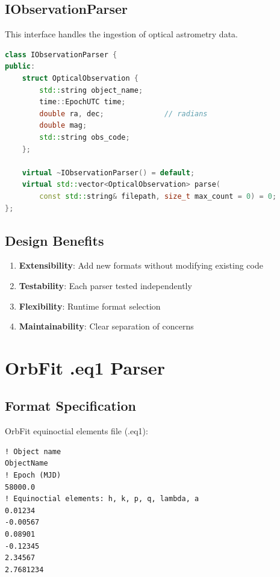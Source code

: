 \subsection{IObservationParser}

This interface handles the ingestion of optical astrometry data.

\begin{lstlisting}[language=C++,caption={IObservationParser interface}]
class IObservationParser {
public:
    struct OpticalObservation {
        std::string object_name;
        time::EpochUTC time;
        double ra, dec;              // radians
        double mag;
        std::string obs_code;
    };

    virtual ~IObservationParser() = default;
    virtual std::vector<OpticalObservation> parse(
        const std::string& filepath, size_t max_count = 0) = 0;
};
\end{lstlisting}

\subsection{Design Benefits}

\begin{enumerate}
    \item \textbf{Extensibility}: Add new formats without modifying existing code
    \item \textbf{Testability}: Each parser tested independently
    \item \textbf{Flexibility}: Runtime format selection
    \item \textbf{Maintainability}: Clear separation of concerns
\end{enumerate}

\section{OrbFit .eq1 Parser}

\subsection{Format Specification}

OrbFit equinoctial elements file (.eq1):

\begin{verbatim}
! Object name
ObjectName
! Epoch (MJD)
58000.0
! Equinoctial elements: h, k, p, q, lambda, a
0.01234
-0.00567
0.08901
-0.12345
2.34567
2.7681234
\end{verbatim}


